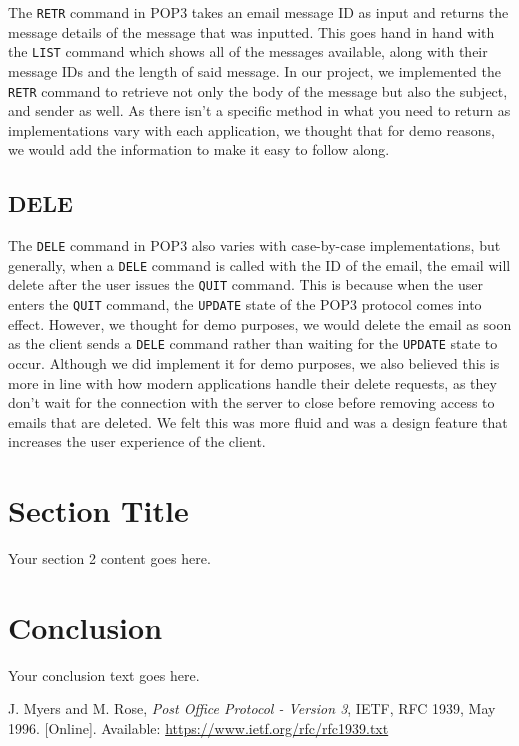 \documentclass[12pt]{article}
\begin{document}
The \texttt{RETR} command in POP3 takes an email message ID as input and returns the message details of the message that was inputted. This goes hand in hand with the \texttt{LIST} command which shows all of the messages available, along with their message IDs and the length of said message. In our project, we implemented the \texttt{RETR} command to retrieve not only the body of the message but also the subject, and sender as well. As there isn’t a specific method in what you need to return as implementations vary with each application, we thought that for demo reasons, we would add the information to make it easy to follow along. 

\subsection{DELE}

The \texttt{DELE} command in POP3 also varies with case-by-case implementations, but generally, when a \texttt{DELE} command is called with the ID of the email, the email will delete after the user issues the \texttt{QUIT} command. This is because when the user enters the \texttt{QUIT} command, the \texttt{UPDATE} state of the POP3 protocol comes into effect. However, we thought for demo purposes, we would delete the email as soon as the client sends a \texttt{DELE} command rather than waiting for the \texttt{UPDATE} state to occur. Although we did implement it for demo purposes, we also believed this is more in line with how modern applications handle their delete requests, as they don’t wait for the connection with the server to close before removing access to emails that are deleted. We felt this was more fluid and was a design feature that increases the user experience of the client.

\section{Section Title}
Your section 2 content goes here.

\section{Conclusion}
Your conclusion text goes here.

\begin{thebibliography}{9}

    J. Myers and M. Rose,
    \emph{Post Office Protocol - Version 3},
    IETF, RFC 1939,
    May 1996.
    [Online]. Available: \url{https://www.ietf.org/rfc/rfc1939.txt}

\end{thebibliography}
\end{document}
